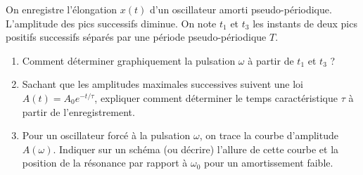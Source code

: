 \documentclass[11pt]{article}
\begin{document}
\begin{exercice}
On enregistre l'élongation $x(t)$ d'un oscillateur amorti pseudo-périodique. L'amplitude des pics successifs diminue. On note $t_1$ et $t_3$ les instants de deux pics positifs successifs séparés par une période pseudo-périodique $T$.
\begin{enumerate}
    \item Comment déterminer graphiquement la pulsation $\omega$ à partir de $t_1$ et $t_3$ ?
    \item Sachant que les amplitudes maximales successives suivent une loi $A(t) = A_0 e^{-t/\tau}$, expliquer comment déterminer le temps caractéristique $\tau$ à partir de l'enregistrement.
    \item Pour un oscillateur forcé à la pulsation $\omega$, on trace la courbe d'amplitude $A(\omega)$. Indiquer sur un schéma (ou décrire) l'allure de cette courbe et la position de la résonance par rapport à $\omega_0$ pour un amortissement faible.
\end{enumerate}
\end{exercice}
\end{document}
